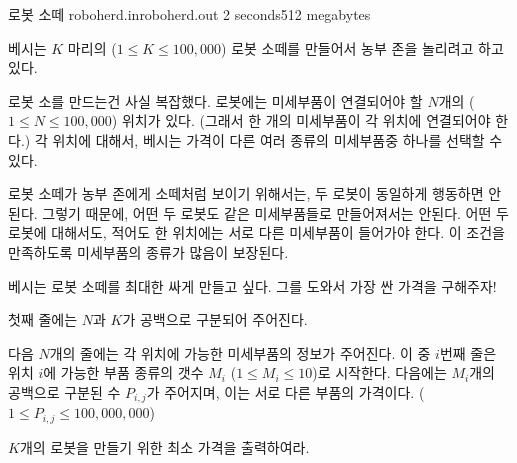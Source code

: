 \begin{problem}{로봇 소떼}
	{roboherd.in}{roboherd.out}
	{2 seconds}{512 megabytes}{}
	
	
	베시는 $K$ 마리의 ($1 \le K \le 100,000$) 로봇 소떼를 만들어서 농부 존을 놀리려고 하고 있다.
	
	로봇 소를 만드는건 사실 복잡했다. 로봇에는 미세부품이 연결되어야 할 $N$개의 ($1 \le N \le 100,000$) 위치가 있다. (그래서 한 개의 미세부품이 각 위치에 연결되어야 한다.) 각 위치에 대해서, 베시는 가격이 다른 여러 종류의 미세부품중 하나를 선택할 수 있다.
	
	로봇 소떼가 농부 존에게 소떼처럼 보이기 위해서는, 두 로봇이 동일하게 행동하면 안된다. 그렇기 때문에, 어떤 두 로봇도 같은 미세부품들로 만들어져서는 안된다. 어떤 두 로봇에 대해서도, 적어도 한 위치에는 서로 다른 미세부품이 들어가야 한다. 이 조건을 만족하도록 미세부품의 종류가 많음이 보장된다.
	
	베시는 로봇 소떼를 최대한 싸게 만들고 싶다. 그를 도와서 가장 싼 가격을 구해주자!
	
	
	
	
	\InputFile
	
	첫째 줄에는 $N$과 $K$가 공백으로 구분되어 주어진다.
	
	다음 $N$개의 줄에는 각 위치에 가능한 미세부품의 정보가 주어진다. 이 중 $i$번째 줄은 위치 $i$에 가능한 부품 종류의 갯수 $M_i$ ($1 \le M_i \le 10$)로 시작한다. 다음에는 $M_i$개의 공백으로 구분된 수 $P_{i,j}$가 주어지며, 이는 서로 다른 부품의 가격이다. ($1 \le P_{i, j} \le 100,000,000$)
	
	
	\OutputFile
	
	$K$개의 로봇을 만들기 위한 최소 가격을 출력하여라.
	
	\Constraints
		
	\begin{example}
	\end{example}

	
\end{problem}

